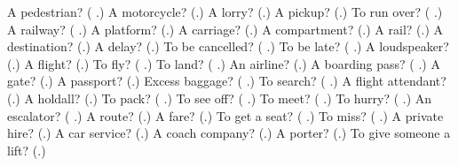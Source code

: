 \begin{tcolorbox}[breakable,colback=teal!4,colframe=teal!35!black,title={Before you move on}]
A pedestrian? (\textbf{ }.) A motorcycle? (\textbf{}.) A lorry? (\textbf{}.) A pickup? (\textbf{}.) To run over? (\textbf{ }.) A railway? (\textbf{ }.) A platform? (\textbf{}.) A carriage? (\textbf{}.) A compartment? (\textbf{}.) A rail? (\textbf{}.) A destination? (\textbf{}.) A delay? (\textbf{}.) To be cancelled? (\textbf{ }.) To be late? (\textbf{ }.) A loudspeaker? (\textbf{}.) A flight? (\textbf{}.) To fly? (\textbf{ }.) To land? (\textbf{ }.) An airline? (\textbf{}.) A boarding pass? (\textbf{ }.) A gate? (\textbf{}.) A passport? (\textbf{}.) Excess baggage? (\textbf{ }.) To search? (\textbf{ }.) A flight attendant? (\textbf{}.) A holdall? (\textbf{}.) To pack? (\textbf{ }.) To see off? (\textbf{ }.) To meet? (\textbf{ }.) To hurry? (\textbf{ }.) An escalator? (\textbf{ }.) A route? (\textbf{}.) A fare? (\textbf{}.) To get a seat? (\textbf{ }.) To miss? (\textbf{ }.) A private hire? (\textbf{}.) A car service? (\textbf{}.) A coach company? (\textbf{}.) A porter? (\textbf{}.) To give someone a lift? (\textbf{}.)
\end{tcolorbox}
